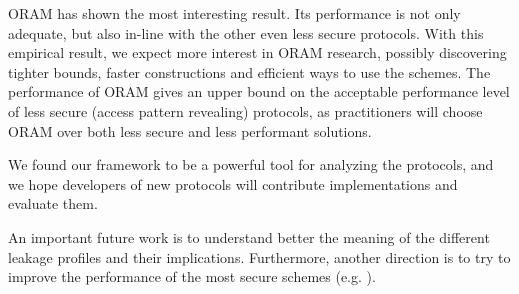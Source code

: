 	ORAM has shown the most interesting result.
	Its performance is not only adequate, but also in-line with the other even less secure protocols.
	With this empirical result, we expect more interest in ORAM research, possibly discovering tighter bounds, faster constructions and efficient ways to use the schemes.
	The performance of ORAM gives an upper bound on the acceptable performance level of less secure (access pattern revealing) protocols, as practitioners will choose ORAM over both less secure and less performant solutions.

	We found our framework to be a powerful tool for analyzing the protocols, and we hope developers of new protocols will contribute implementations and evaluate them.

	An important future work is to understand better the meaning of the different leakage profiles and their implications.
	Furthermore, another direction is to try to improve the performance of the most secure schemes (e.g. \cite{parameter-hiding-ore}). %
